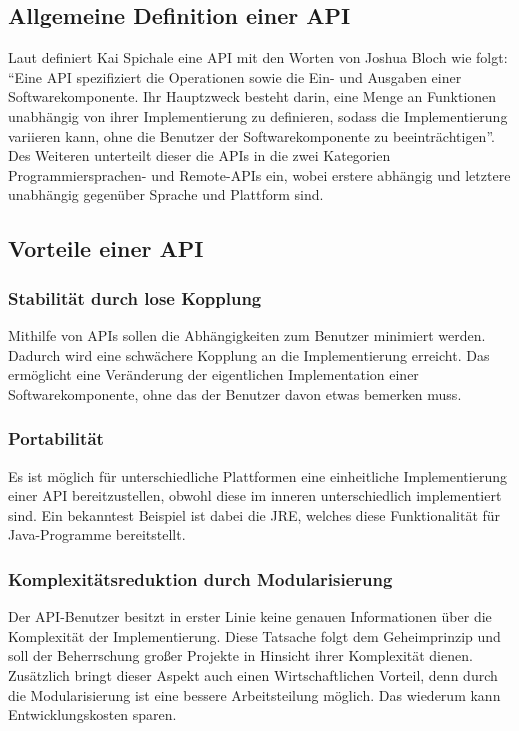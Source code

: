\subsection{Allgemeine Definition einer API}\label{sec:defAPI}
Laut \cite[7]{apiDesign} definiert Kai Spichale eine \gls{API} mit den Worten von Joshua Bloch wie folgt: \enquote{Eine API spezifiziert die Operationen sowie die Ein- und Ausgaben einer Softwarekomponente. Ihr Hauptzweck besteht darin, eine Menge an Funktionen unabhängig von ihrer Implementierung zu definieren, sodass die Implementierung variieren kann, ohne die Benutzer der Softwarekomponente zu beeinträchtigen}. Des Weiteren unterteilt dieser die \glspl{API} in die zwei Kategorien Programmiersprachen- und Remote-\glspl{API} ein, wobei erstere abhängig und letztere unabhängig gegenüber Sprache und Plattform sind.

\subsection{Vorteile einer API}
\subsubsection{Stabilität durch lose Kopplung}
Mithilfe von \glspl{API} sollen die Abhängigkeiten zum Benutzer minimiert werden. Dadurch wird eine schwächere Kopplung an die Implementierung erreicht. Das ermöglicht eine Veränderung der eigentlichen Implementation einer Softwarekomponente, ohne das der Benutzer davon etwas bemerken muss.

\subsubsection{Portabilität}
Es ist möglich für unterschiedliche Plattformen eine einheitliche Implementierung einer \gls{API} bereitzustellen, obwohl diese im inneren unterschiedlich implementiert sind. Ein bekanntest Beispiel ist dabei die \gls{JRE}, welches diese Funktionalität für Java-Programme bereitstellt.

\subsubsection{Komplexitätsreduktion durch Modularisierung}
Der \gls{API}-Benutzer besitzt in erster Linie keine genauen Informationen über die Komplexität der Implementierung. Diese Tatsache folgt dem Geheimprinzip und soll der Beherrschung großer Projekte in Hinsicht ihrer Komplexität dienen. Zusätzlich bringt dieser Aspekt auch einen Wirtschaftlichen Vorteil, denn durch die Modularisierung ist eine bessere Arbeitsteilung möglich. Das wiederum kann Entwicklungskosten sparen.

